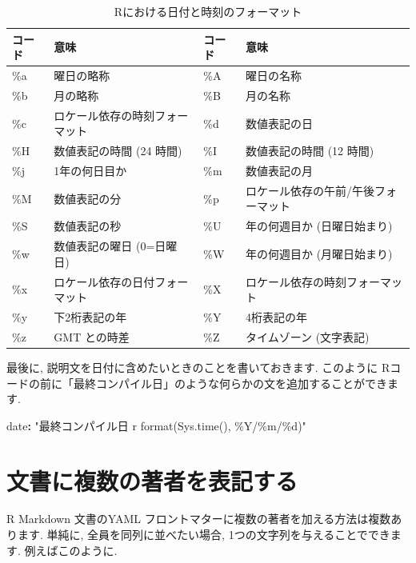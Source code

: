 \documentclass[
  11pt,
  lualatex,ja=standard,jafont=noto]{bxjsreport}
\newenvironment{Shaded}{\begin{snugshade}}{\end{snugshade}}
\newcommand{\AttributeTok}[1]{\textcolor[rgb]{0.77,0.63,0.00}{#1}}
\newcommand{\FunctionTok}[1]{\textcolor[rgb]{0.00,0.00,0.00}{#1}}
\newcommand{\KeywordTok}[1]{\textcolor[rgb]{0.13,0.29,0.53}{\textbf{#1}}}
\newcommand{\StringTok}[1]{\textcolor[rgb]{0.31,0.60,0.02}{#1}}
\begin{document}
\begin{table}
\caption{\label{tab:date-format} Rにおける日付と時刻のフォーマット}\tabularnewline
\begin{tabular}{llll}
\toprule
コード & 意味 & コード & 意味 \\
\midrule

\%a & 曜日の略称 & \%A & 曜日の名称 \\
\%b & 月の略称 & \%B & 月の名称 \\
\%c & ロケール依存の時刻フォーマット & \%d & 数値表記の日 \\
\%H & 数値表記の時間 (24 時間) & \%I & 数値表記の時間 (12 時間) \\
\%j & 1年の何日目か & \%m & 数値表記の月 \\
\%M & 数値表記の分 & \%p & ロケール依存の午前/午後フォーマット \\
\%S & 数値表記の秒 & \%U & 年の何週目か (日曜日始まり) \\
\%w & 数値表記の曜日 (0=日曜日) & \%W & 年の何週目か (月曜日始まり) \\
\%x & ロケール依存の日付フォーマット & \%X & ロケール依存の時刻フォーマット \\
\%y & 下2桁表記の年 & \%Y & 4桁表記の年 \\
\%z & GMT との時差 & \%Z & タイムゾーン (文字表記) \\
\bottomrule
\end{tabular}
\end{table}

最後に, 説明文を日付に含めたいときのことを書いておきます. このように Rコードの前に「最終コンパイル日」のような何らかの文を追加することができます.

\begin{Shaded}
\begin{Highlighting}[]
\FunctionTok{date}\KeywordTok{:}\AttributeTok{ }\StringTok{"最終コンパイル日 \textasciigrave{}r format(Sys.time(), \textquotesingle{}\%Y/\%m/\%d\textquotesingle{})\textasciigrave{}"}
\end{Highlighting}
\end{Shaded}

\hypertarget{multiple-authors}{%
\section{文書に複数の著者を表記する}\label{multiple-authors}}

R Markdown 文書のYAML フロントマターに複数の著者を加える方法は複数あります. 単純に, 全員を同列に並べたい場合, 1つの文字列を与えることでできます. 例えばこのように.
\end{document}
